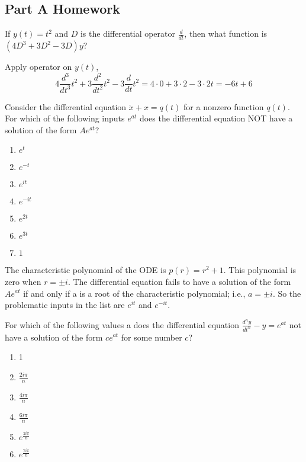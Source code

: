 \subsection{Part A Homework}

\begin{problem}
  If $y(t)=t^2$ and $D$ is the differential operator $\frac{d}{dt}$, then what function is $(4D^3 +3D^2−3D)y$?
\end{problem}

Apply operator on $y(t)$,
\begin{equation*}
  4 \frac{d^3}{dt^3} t^2 + 3 \frac{d^2}{dt^2} t^2  - 3 \frac{d}{dt} t^2
  = 4 \cdot 0 + 3 \cdot 2 - 3\cdot 2t = -6t + 6 
\end{equation*}

\begin{problem}
  Consider the differential equation $\ddot x + x = q(t)$ for a nonzero function $q(t)$.
  For which of the following inputs $e^{at}$ does the differential equation NOT have a solution of the form $Ae^{at}$? 
\end{problem}

\begin{enumerate}
\item $e^t$
\item $e^{-t}$
\item $e^{it}$
\item $e^{-it}$
\item $e^{2t}$
\item $e^{3t}$
\item $1$
\end{enumerate}

The characteristic polynomial of the ODE is $p(r)=r^2+1$.
This polynomial is zero when $r= \pm i$.
The differential equation fails to have a solution of the form $Ae^{at}$ if and only if a is a root of the characteristic polynomial; i.e., $a=\pm i$. So the problematic inputs in the list are $e^{it}$ and $e^{−it}$.

\begin{problem}
  For which of the following values a does the differential equation $\frac{d^n y}{dt^n}−y = e^{at}$
  not have a solution of the form $ce^{at}$ for some number $c$?
\end{problem}

\begin{enumerate}
\item 1
\item $\frac{2i\pi }{n}$
\item $\frac{4i\pi }{n}$
\item $\frac{6i\pi }{n}$
\item $e^{\frac{2i\pi }{n}}$
\item $e^{\frac{7i\pi }{n}}$
\end{enumerate}

